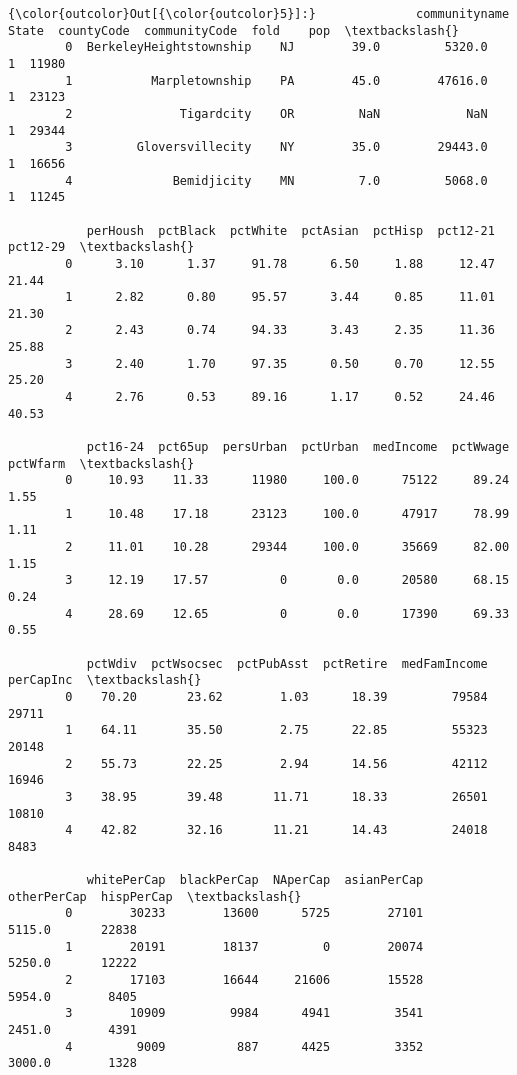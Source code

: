 \documentclass[11pt]{llncs}
\begin{document}
\begin{Verbatim}[commandchars=\\\{\}]
{\color{outcolor}Out[{\color{outcolor}5}]:}              communityname State  countyCode  communityCode  fold    pop  \textbackslash{}
        0  BerkeleyHeightstownship    NJ        39.0         5320.0     1  11980   
        1           Marpletownship    PA        45.0        47616.0     1  23123   
        2               Tigardcity    OR         NaN            NaN     1  29344   
        3         Gloversvillecity    NY        35.0        29443.0     1  16656   
        4              Bemidjicity    MN         7.0         5068.0     1  11245   
        
           perHoush  pctBlack  pctWhite  pctAsian  pctHisp  pct12-21  pct12-29  \textbackslash{}
        0      3.10      1.37     91.78      6.50     1.88     12.47     21.44   
        1      2.82      0.80     95.57      3.44     0.85     11.01     21.30   
        2      2.43      0.74     94.33      3.43     2.35     11.36     25.88   
        3      2.40      1.70     97.35      0.50     0.70     12.55     25.20   
        4      2.76      0.53     89.16      1.17     0.52     24.46     40.53   
        
           pct16-24  pct65up  persUrban  pctUrban  medIncome  pctWwage  pctWfarm  \textbackslash{}
        0     10.93    11.33      11980     100.0      75122     89.24      1.55   
        1     10.48    17.18      23123     100.0      47917     78.99      1.11   
        2     11.01    10.28      29344     100.0      35669     82.00      1.15   
        3     12.19    17.57          0       0.0      20580     68.15      0.24   
        4     28.69    12.65          0       0.0      17390     69.33      0.55   
        
           pctWdiv  pctWsocsec  pctPubAsst  pctRetire  medFamIncome  perCapInc  \textbackslash{}
        0    70.20       23.62        1.03      18.39         79584      29711   
        1    64.11       35.50        2.75      22.85         55323      20148   
        2    55.73       22.25        2.94      14.56         42112      16946   
        3    38.95       39.48       11.71      18.33         26501      10810   
        4    42.82       32.16       11.21      14.43         24018       8483   
        
           whitePerCap  blackPerCap  NAperCap  asianPerCap  otherPerCap  hispPerCap  \textbackslash{}
        0        30233        13600      5725        27101       5115.0       22838   
        1        20191        18137         0        20074       5250.0       12222   
        2        17103        16644     21606        15528       5954.0        8405   
        3        10909         9984      4941         3541       2451.0        4391   
        4         9009          887      4425         3352       3000.0        1328   
        

\end{Verbatim}
\end{document}
